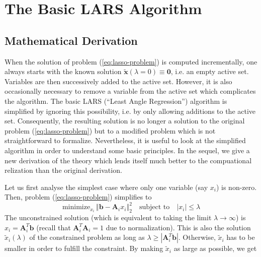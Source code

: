 \section{The Basic LARS Algorithm}


\subsection{Mathematical Derivation}


When the solution of problem (\ref{eq:lasso-problem}) is computed
incrementally, one always starts with the known solution $\tilde{\mathbf{x}}\left(\lambda=0\right)\equiv\mathbf{0}$,
i.e. an empty active set. Variables are then successively added to
the active set. However, it is also occasionally necessary to remove
a variable from the active set which complicates the algorithm. The
basic LARS (``Least Angle Regression'') algorithm is simplified
by ignoring this possibility, i.e. by only allowing additions to the
active set. Consequently, the resulting solution is no longer a solution
to the original problem (\ref{eq:lasso-problem}) but to a modified
problem which is not straightforward to formalize. Nevertheless, it
is useful to look at the simplified algorithm in order to understand
some basic principles. In the sequel, we give a new derivation of
the theory which lends itself much better to the compuational relization
than the original derivation.


Let us first analyse the simplest case where only one variable (say
$x_{i}$) is non-zero. Then, problem (\ref{eq:lasso-problem}) simplifies
to
\begin{equation}
\textrm{minimize}_{x_{i}}\,\left\Vert \mathbf{b}-\mathbf{A}_{i}x_{i}\right\Vert _{2}^{2}\quad\textrm{subject to}\quad\left|x_{i}\right|\le\lambda
\end{equation}
The unconstrained solution (which is equivalent to taking the limit
$\lambda\rightarrow\infty$) is $\hat{x}_{i}=\mathbf{A}_{i}^{T}\mathbf{b}$
(recall that $\mathbf{A}_{i}^{T}\mathbf{A}_{i}=1$ due to normalization).
This is also the solution $\tilde{x}_{i}(\lambda)$ of the constrained
problem as long as $\lambda\ge\left|\mathbf{A}_{i}^{T}\mathbf{b}\right|$.
Otherwise, $\tilde{x}_{i}$ has to be smaller in order to fulfill
the constraint. By making $\tilde{x}_{i}$ as large as possible, we
get


